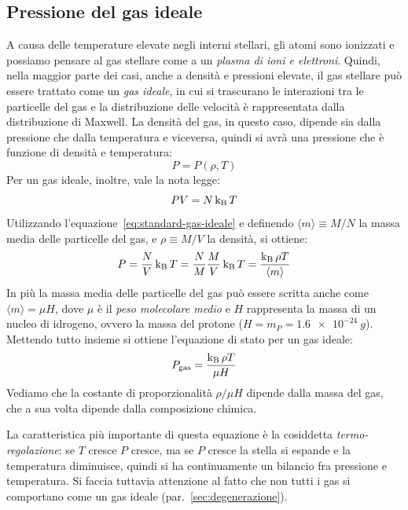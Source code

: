 \subsection{Pressione del gas ideale}\label{sec:gas-perfetto}
A causa delle temperature elevate negli interni stellari, gli atomi sono ionizzati e possiamo pensare al gas stellare come a un \emph{plasma di ioni e elettroni}. Quindi, nella maggior parte dei casi, anche a densità e pressioni elevate, il gas stellare può essere trattato come un \emph{gas ideale}, in cui si trascurano le interazioni tra le particelle del gas e la distribuzione delle velocità è rappresentata dalla distribuzione di Maxwell. La densità del gas, in questo caso, dipende sia dalla pressione che dalla temperatura e viceversa, quindi si avrà una pressione che è funzione di densità e temperatura: 
\[
P = P (\rho, T)
\]
Per un gas ideale, inoltre, vale la nota legge:
\begin{equation}\label{eq:standard-gas-ideale}
    PV = N \operatorname{k_B} T
\end{equation}
Utilizzando l'equazione~\eqref{eq:standard-gas-ideale} e definendo $\langle m \rangle \equiv M / N$ la massa media delle particelle del gas, e $\rho \equiv M / V$ la densità, si ottiene:
\[
P = \frac{N}{V} \operatorname{k_B} T = \frac{N}{M} \frac{M}{V} \operatorname{k_B} T = \frac{\operatorname{k_B} \rho T}{\langle m \rangle}
\]
In più la massa media delle particelle del gas può essere scritta anche come $\langle m \rangle = \mu H$, dove $\mu$ è il \emph{peso molecolare medio} e $H$ rappresenta la massa di un nucleo di idrogeno, ovvero la massa del protone ($H = m_P = \SI{1.6e-24}{g}$). Mettendo tutto insieme si ottiene l'equazione di stato per un gas ideale:
\begin{equation}\label{eq:gas-ideale}
    P_\textup{gas} = \frac{\operatorname{k_B} \rho T}{\mu H}
\end{equation}
Vediamo che la costante di proporzionalità $\rho / \mu H$ dipende dalla massa del gas, che a sua volta dipende dalla composizione chimica.

La caratteristica più importante di questa equazione è la cosiddetta \emph{termo-regolazione}: se $T$ cresce $P$ cresce, ma se $P$ cresce la stella si espande e la temperatura diminuisce, quindi si ha continuamente un bilancio fra pressione e temperatura. Si faccia tuttavia attenzione al fatto che non tutti i gas si comportano come un gas ideale (par.~\ref{sec:degenerazione}).

